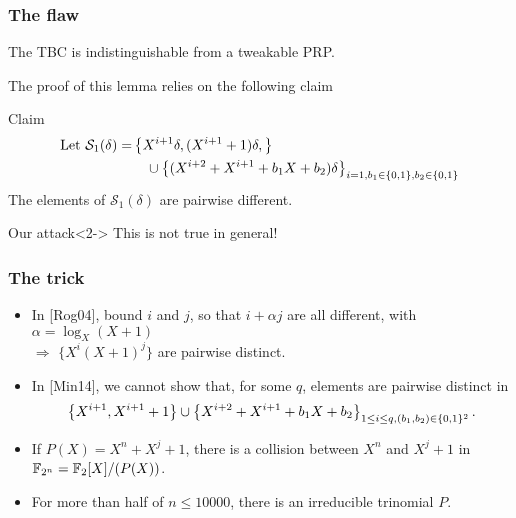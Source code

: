 \documentclass{beamer}
\begin{document}
				\begin{frame}
					\frametitle{The flaw}

					\begin{lemma}[{Lemma 1 of [Min14]}]
						The TBC is indistinguishable from a tweakable PRP.
					\end{lemma}
					The proof of this lemma relies on the following claim
					\begin{block}{Claim}
						\begin{align*}
							\mbox{Let }\mathcal{S}_1(\delta) = & \left\{X^{i+1}\delta, (X^{i+1} +1)\delta,\right\} \\
							&\ \ \  \cup \left\{ (X^{i+2} + X^{i+1} + b_1 X + b_2)\delta \right\}_{i=1, b_1 \in \{0, 1\}, b_2 \in \{0, 1\}} 
						\end{align*}
						The elements of $\mathcal{S}_1(\delta)$
						are pairwise different.
					\end{block}
	
					\begin{alertblock}{Our attack}<2->
						This is not true in general!
					\end{alertblock}

				\end{frame}

				\begin{frame}
					\frametitle{The trick}

					\begin{itemize}
						\item In [Rog04], bound $i$ and $j$, so that $i + \alpha j$ are all different, with $\alpha = \log_X (X+1)$  
						\\ \tab $\Rightarrow$ $\{X^i (X+1)^j\}$ are pairwise distinct.
			
						\item<2-> In [Min14], we cannot show that, for some $q$, elements are pairwise distinct in 
						\[
						\left\{X^{i+1}, X^{i+1} +1 \right\} \cup \left\{ X^{i+2} + X^{i+1} + b_1 X + b_2\right\}_{1\leq i \leq q, (b_1,b_2) \in \{0, 1\}^2}.
						\]
		
						\item<3-> If $P(X) = X^n + X^j + 1$, there is a collision between $X^n$ and $X^j + 1$ in $\mathbb{F}_{2^n} = \mathbb{F}_2[X]/(P(X))$.
			
						\item<4-> For more than half of $n \leq 10 000$, there is an irreducible trinomial $P$.
					\end{itemize}
				\end{frame}
\end{document}

